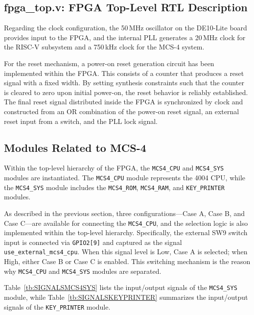 \subsection{fpga\_top.v: FPGA Top-Level RTL Description}
Regarding the clock configuration, the 50\,MHz oscillator on the DE10-Lite board provides input to the FPGA, and the internal PLL generates a 20\,MHz clock for the RISC-V subsystem and a 750\,kHz clock for the MCS-4 system.

For the reset mechanism, a power-on reset generation circuit has been implemented within the FPGA. This consists of a counter that produces a reset signal with a fixed width. By setting synthesis constraints such that the counter is cleared to zero upon initial power-on, the reset behavior is reliably established. The final reset signal distributed inside the FPGA is synchronized by clock and constructed from an OR combination of the power-on reset signal, an external reset input from a switch, and the PLL lock signal.

\subsection{Modules Related to MCS-4}
Within the top-level hierarchy of the FPGA, the \texttt{MCS4\_CPU} and \texttt{MCS4\_SYS} modules are instantiated. The \texttt{MCS4\_CPU} module represents the 4004 CPU, while the \texttt{MCS4\_SYS} module includes the \texttt{MCS4\_ROM}, \texttt{MCS4\_RAM}, and \texttt{KEY\_PRINTER} modules.

As described in the previous section, three configurations—Case A, Case B, and Case C—are available for connecting the \texttt{MCS4\_CPU}, and the selection logic is also implemented within the top-level hierarchy. Specifically, the external SW9 switch input is connected via \texttt{GPIO2[9]} and captured as the signal \texttt{use\_external\_mcs4\_cpu}. When this signal level is Low, Case A is selected; when High, either Case B or Case C is enabled. This switching mechanism is the reason why \texttt{MCS4\_CPU} and \texttt{MCS4\_SYS} modules are separated.

Table~\ref{tb:SIGNALSMCS4SYS} lists the input/output signals of the \texttt{MCS4\_SYS} module, while Table~\ref{tb:SIGNALSKEYPRINTER} summarizes the input/output signals of the \texttt{KEY\_PRINTER} module.

